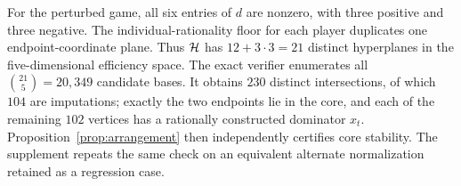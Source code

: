 For the perturbed game, all six entries of $d$ are nonzero, with three
positive and three negative. The individual-rationality floor for each player
duplicates one endpoint-coordinate plane. Thus ${\cal H}$ has
$12+3\cdot3=21$ distinct hyperplanes in the five-dimensional efficiency
space. The exact verifier enumerates all $\binom{21}{5}=20{,}349$ candidate
bases. It obtains $230$ distinct intersections, of which $104$ are
imputations; exactly the two endpoints lie in the core, and each of the
remaining $102$ vertices has a rationally constructed dominator $x_t$.
Proposition~\ref{prop:arrangement} then independently certifies core
stability. The supplement repeats the same check on an equivalent alternate
normalization retained as a regression case.
